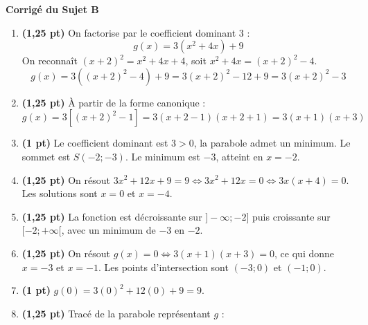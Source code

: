 \documentclass[11pt,a4paper]{article}
\newcommand{\partie}[1]{%
  \vspace{0.9em}%
  \noindent\textbf{#1}%
  \par\vspace{0.3em}%
}
\begin{document}
\vspace{1.5em}
\partie{Corrigé du Sujet B}
\begin{enumerate}
    \item \textbf{(1,25 pt)} On factorise par le coefficient dominant $3$ :
    $$g(x) = 3(x^2 + 4x) + 9$$
    On reconnaît $(x+2)^2 = x^2 + 4x + 4$, soit $x^2 + 4x = (x+2)^2 - 4$.
    $$g(x) = 3\left((x+2)^2 - 4\right) + 9 = 3(x+2)^2 - 12 + 9 = 3(x+2)^2 - 3$$
    \item \textbf{(1,25 pt)} À partir de la forme canonique :
    $$g(x) = 3\left[(x+2)^2 - 1\right] = 3(x + 2 - 1)(x + 2 + 1) = 3(x + 1)(x + 3)$$
    \item \textbf{(1 pt)} Le coefficient dominant est $3 > 0$, la parabole admet un minimum. Le sommet est $S(-2 ; -3)$. Le minimum est $-3$, atteint en $x = -2$.
    \item \textbf{(1,25 pt)} On résout $3x^2 + 12x + 9 = 9 \iff 3x^2 + 12x = 0 \iff 3x(x + 4) = 0$. Les solutions sont $x = 0$ et $x = -4$.
    \item \textbf{(1,25 pt)} La fonction est décroissante sur $]-\infty ; -2]$ puis croissante sur $[-2 ; +\infty[$, avec un minimum de $-3$ en $-2$.
    \item \textbf{(1,25 pt)} On résout $g(x) = 0 \iff 3(x+1)(x+3) = 0$, ce qui donne $x = -3$ et $x = -1$. Les points d'intersection sont $(-3 ; 0)$ et $(-1 ; 0)$.
    \item \textbf{(1 pt)} $g(0) = 3(0)^2 + 12(0) + 9 = 9$.
    \item \textbf{(1,25 pt)} Tracé de la parabole représentant $g$ :
    
    \begin{center}
    \end{center}
\end{enumerate}
\end{document}

